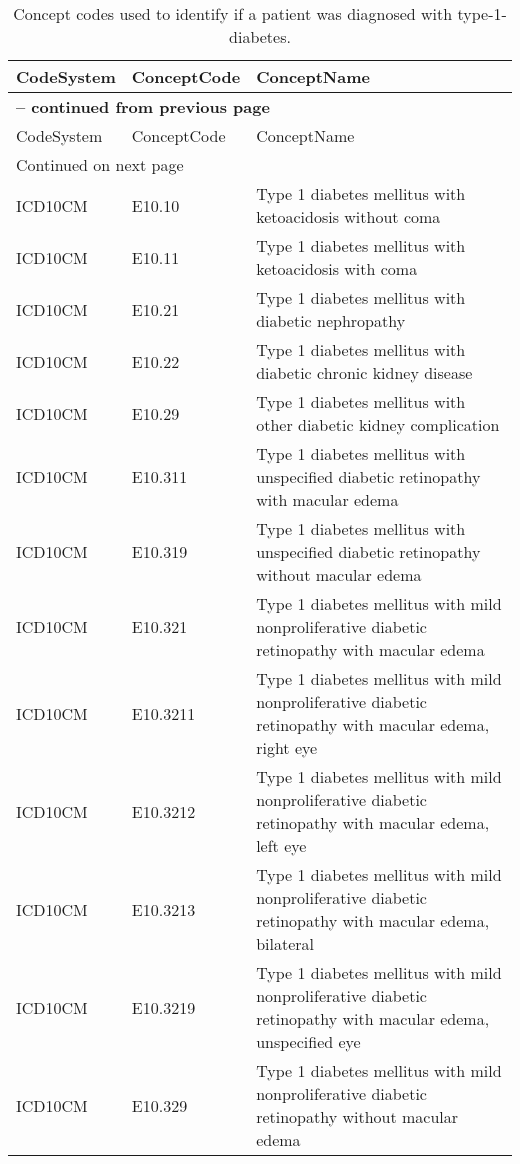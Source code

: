 \begin{longtable}{p{}p{}p{}}
\caption{Concept codes used to identify if a patient was diagnosed with type-1-diabetes.} \\ 
 CodeSystem & ConceptCode & ConceptName \\ 
  \hline 
\endfirsthead 
\multicolumn{3}{p{\textwidth}}{{ \bfseries \tablename \thetable{} -- continued from previous page}} \\ 
\hline CodeSystem & ConceptCode & ConceptName \\ \hline 
\endhead 
\hline \multicolumn{3}{p{\textwidth}}{{Continued on next page}} \\ \hline 
\endfoot 
\hline 
\endlastfoot 
 \hline
ICD10CM & E10.10 & Type 1 diabetes mellitus with ketoacidosis without coma \\ 
  ICD10CM & E10.11 & Type 1 diabetes mellitus with ketoacidosis with coma \\ 
  ICD10CM & E10.21 & Type 1 diabetes mellitus with diabetic nephropathy \\ 
  ICD10CM & E10.22 & Type 1 diabetes mellitus with diabetic chronic kidney disease \\ 
  ICD10CM & E10.29 & Type 1 diabetes mellitus with other diabetic kidney complication \\ 
  ICD10CM & E10.311 & Type 1 diabetes mellitus with unspecified diabetic retinopathy with macular edema \\ 
  ICD10CM & E10.319 & Type 1 diabetes mellitus with unspecified diabetic retinopathy without macular edema \\ 
  ICD10CM & E10.321 & Type 1 diabetes mellitus with mild nonproliferative diabetic retinopathy with macular edema \\ 
  ICD10CM & E10.3211 & Type 1 diabetes mellitus with mild nonproliferative diabetic retinopathy with macular edema, right eye \\ 
  ICD10CM & E10.3212 & Type 1 diabetes mellitus with mild nonproliferative diabetic retinopathy with macular edema, left eye \\ 
  ICD10CM & E10.3213 & Type 1 diabetes mellitus with mild nonproliferative diabetic retinopathy with macular edema, bilateral \\ 
  ICD10CM & E10.3219 & Type 1 diabetes mellitus with mild nonproliferative diabetic retinopathy with macular edema, unspecified eye \\ 
  ICD10CM & E10.329 & Type 1 diabetes mellitus with mild nonproliferative diabetic retinopathy without macular edema \\ 

\end{longtable}

